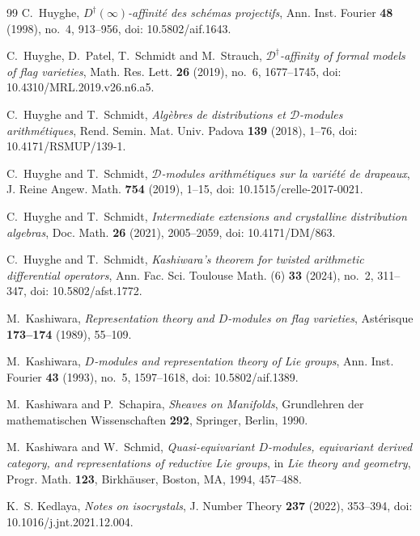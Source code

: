 \documentclass[11pt]{amsart}
\theoremstyle{plain}
\theoremstyle{definition}
\theoremstyle{remark}
\begin{document}
\begin{thebibliography}{99}
C.~Huyghe,
\emph{\(D^\dagger(\infty)\)-affinit\'e des sch\'emas projectifs},
Ann. Inst. Fourier \textbf{48} (1998), no.~4, 913--956,
doi: 10.5802/aif.1643.

C.~Huyghe, D.~Patel, T.~Schmidt and M.~Strauch,
\emph{\(\mathscr D^{\dagger}\)-affinity of formal models of flag varieties},
Math. Res. Lett. \textbf{26} (2019), no.~6, 1677--1745,
doi: 10.4310/MRL.2019.v26.n6.a5.

C.~Huyghe and T.~Schmidt,
\emph{Alg\`ebres de distributions et \(\mathcal D\)-modules arithm\'etiques},
Rend. Semin. Mat. Univ. Padova \textbf{139} (2018), 1--76,
doi: 10.4171/RSMUP/139-1.

C.~Huyghe and T.~Schmidt,
\emph{\(\mathcal D\)-modules arithm\'etiques sur la vari\'et\'e de drapeaux},
J. Reine Angew. Math. \textbf{754} (2019), 1--15,
doi: 10.1515/crelle-2017-0021.

C.~Huyghe and T.~Schmidt,
\emph{Intermediate extensions and crystalline distribution algebras},
Doc. Math. \textbf{26} (2021), 2005--2059,
doi: 10.4171/DM/863.

C.~Huyghe and T.~Schmidt,
\emph{Kashiwara's theorem for twisted arithmetic differential operators},
Ann. Fac. Sci. Toulouse Math. (6) \textbf{33} (2024), no.~2, 311--347,
doi: 10.5802/afst.1772.

M.~Kashiwara,
\emph{Representation theory and \(D\)-modules on flag varieties},
Ast\'erisque \textbf{173--174} (1989), 55--109.

M.~Kashiwara,
\emph{\(D\)-modules and representation theory of Lie groups},
Ann. Inst. Fourier \textbf{43} (1993), no.~5, 1597--1618,
doi: 10.5802/aif.1389.

M.~Kashiwara and P.~Schapira,
\emph{Sheaves on Manifolds},
Grundlehren der mathematischen Wissenschaften \textbf{292}, Springer, Berlin,
1990.

M.~Kashiwara and W.~Schmid,
\emph{Quasi-equivariant \(D\)-modules, equivariant derived category, and representations of reductive Lie groups},
in \emph{Lie theory and geometry}, Progr. Math. \textbf{123}, Birkh\"auser,
Boston, MA, 1994, 457--488.

K.~S. Kedlaya,
\emph{Notes on isocrystals},
J. Number Theory \textbf{237} (2022), 353--394,
doi: 10.1016/j.jnt.2021.12.004.


\end{thebibliography}
\end{document}
